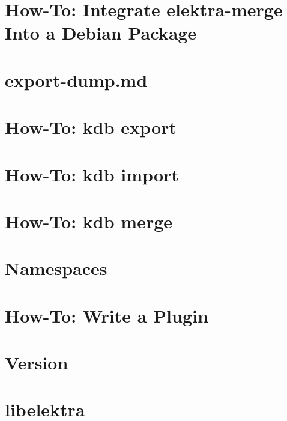 \documentclass[twoside]{book}
\newcommand{\+}{\discretionary{\mbox{\scriptsize$\hookleftarrow$}}{}{}}
\begin{document}
\chapter{How-\/\+To\+: Integrate elektra-\/merge Into a Debian Package}
\label{doc_tutorials_elektra-merge-integration_md}
\hypertarget{doc_tutorials_elektra-merge-integration_md}{}

\chapter{export-\/dump.md}
\label{doc_tutorials_export-dump_md}
\hypertarget{doc_tutorials_export-dump_md}{}

\chapter{How-\/\+To\+: kdb export}
\label{doc_tutorials_export_md}
\hypertarget{doc_tutorials_export_md}{}

\chapter{How-\/\+To\+: kdb import}
\label{doc_tutorials_import_md}
\hypertarget{doc_tutorials_import_md}{}

\chapter{How-\/\+To\+: kdb merge}
\label{doc_tutorials_merge_md}
\hypertarget{doc_tutorials_merge_md}{}

\chapter{Namespaces}
\label{doc_tutorials_namespaces_md}
\hypertarget{doc_tutorials_namespaces_md}{}

\chapter{How-\/\+To\+: Write a Plugin}
\label{doc_tutorials_plugins_md}
\hypertarget{doc_tutorials_plugins_md}{}

\chapter{Version}
\label{doc_VERSION_md}
\hypertarget{doc_VERSION_md}{}

\chapter{libelektra}
\label{README_md}
\hypertarget{README_md}{}

\end{document}
